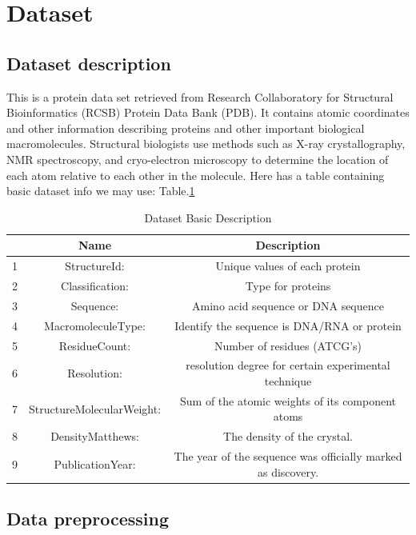 \documentclass[sigconf]{acmart}
\begin{document}
\section{Dataset}
\subsection{Dataset description}
This is a protein data set retrieved from Research Collaboratory for Structural Bioinformatics (RCSB) Protein Data Bank (PDB). It contains atomic coordinates and other information describing proteins and other important biological macromolecules. Structural biologists use methods such as X-ray crystallography, NMR spectroscopy, and cryo-electron microscopy to determine the location of each atom relative to each other in the molecule. Here has a table containing basic dataset info we may use: Table.\ref{tab:dataset}

\begin{table}
  \centering
  \caption{Dataset Basic Description}
  \label{tab:dataset}
  \begin{tabular}{c|c|c}
    \toprule
    & Name & Description \\
    \midrule
    1 & StructureId: & Unique values of each protein\\
    2 & Classification: & Type for proteins\\
    3 & Sequence: & Amino acid sequence or DNA sequence\\
    4 & MacromoleculeType: & Identify the sequence is DNA/RNA or protein\\
    5 & ResidueCount: & Number of residues (ATCG's)\\
    6 & Resolution: & resolution degree for certain experimental technique \\
    7 & StructureMolecularWeight: & Sum of the atomic weights of its component atoms\\
    8 & DensityMatthews: & The density of the crystal.\\
    9 & PublicationYear: & The year of the sequence was officially marked as discovery.\\
  \bottomrule
\end{tabular}
\end{table}

\subsection{Data preprocessing}
\end{document}
